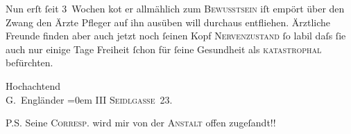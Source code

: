 \pstart
           Nun erſt ſeit 3 {\pb}Wochen ko{\geminationm}t er allmählich zum \textsc{Bewusstsein}{ }{\kaufmannsund} iſt empört über den Zwang den Ärzte{ }{\kaufmannsund} Pfleger auf ihn ausüben {\kaufmannsund}
               will durchaus entfliehen. Ärztliche {\pb}Freunde finden aber auch jetzt noch ſeinen Kopf {\kaufmannsund}{ }\textsc{Nervenzustand} ſo labil daſs ſie auch nur einige Tage
               Freiheit ſchon für ſeine Gesundheit als \textsc{katastrophal}
               befürchten.\pend
           
\pstart
           Hochachtend{\\[\baselineskip]}\spacefill\mbox{G. Engländer}\pend
           \leftskip=0em{}
\pstart
           \noindent{}III \textsc{Seidlgasse} 23.\pend
           
\pstart
           P.S. Seine \textsc{Correſp}. wird mir von der \textsc{Anstalt} offen zugeſandt!!\pend
           \endnumbering{}  
      